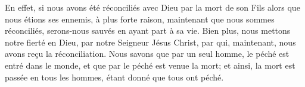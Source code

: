 En effet, si nous avons été réconciliés avec Dieu par la mort de son Fils
		alors que nous étions ses ennemis,
	à plus forte raison, maintenant que nous sommes réconciliés,
	serons-nous sauvés en ayant part à sa vie.
Bien plus, nous mettons notre fierté en Dieu, par notre Seigneur Jésus Christ,
	par qui, maintenant, nous avons reçu la réconciliation.
Nous savons que par un seul homme, le péché est entré dans le monde,
	et que par le péché est venue la mort;
	et ainsi, la mort est passée en tous les hommes,
	étant donné que tous ont péché.
